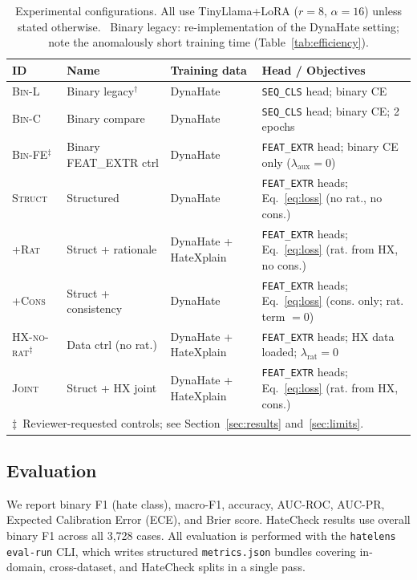 \documentclass{article}
\newcommand{\tl}{TinyLlama\xspace}
\begin{document}
\begin{table}[t]
\centering
\caption{Experimental configurations.
All use \tl{}+LoRA ($r=8$, $\alpha=16$) unless stated otherwise.
\dag~Binary legacy: re-implementation of the \citet{sen2024hatetinyllm}
DynaHate setting; note the anomalously short training time (Table~\ref{tab:efficiency}).}
\label{tab:models}
\small
\begin{tabular}{lllp{5.5cm}}
\toprule
ID & Name & Training data & Head / Objectives \\
\midrule
\textsc{Bin-L} & Binary legacy$^\dag$ & DynaHate & \texttt{SEQ\_CLS} head; binary CE \\
\textsc{Bin-C} & Binary compare & DynaHate & \texttt{SEQ\_CLS} head; binary CE; 2 epochs \\
\textsc{Bin-FE}$^\ddagger$ & Binary FEAT\_EXTR ctrl & DynaHate & \texttt{FEAT\_EXTR} head; binary CE only ($\lambda_\text{aux}{=}0$) \\
\textsc{Struct} & Structured & DynaHate & \texttt{FEAT\_EXTR} heads; Eq.~\ref{eq:loss} (no rat., no cons.) \\
\textsc{+Rat} & Struct + rationale & DynaHate + HateXplain & \texttt{FEAT\_EXTR} heads; Eq.~\ref{eq:loss} (rat. from HX, no cons.) \\
\textsc{+Cons} & Struct + consistency & DynaHate & \texttt{FEAT\_EXTR} heads; Eq.~\ref{eq:loss} (cons. only; rat. term $=0$) \\
\textsc{HX-no-rat}$^\ddagger$ & Data ctrl (no rat.) & DynaHate + HateXplain & \texttt{FEAT\_EXTR} heads; HX data loaded; $\lambda_\text{rat}{=}0$ \\
\textsc{Joint} & Struct + HX joint & DynaHate + HateXplain & \texttt{FEAT\_EXTR} heads; Eq.~\ref{eq:loss} (rat. from HX, cons.) \\
\multicolumn{4}{l}{\small$\ddagger$~Reviewer-requested controls; see Section~\ref{sec:results} and~\ref{sec:limits}.} \\
\bottomrule
\end{tabular}
\end{table}

\subsection{Evaluation}
We report binary F1 (hate class), macro-F1, accuracy, AUC-ROC, AUC-PR,
Expected Calibration Error (ECE), and Brier score.
HateCheck results use overall binary F1 across all 3,728 cases.
All evaluation is performed with the \texttt{hatelens eval-run} CLI,
which writes structured \texttt{metrics.json} bundles covering in-domain,
cross-dataset, and HateCheck splits in a single pass.
\end{document}
